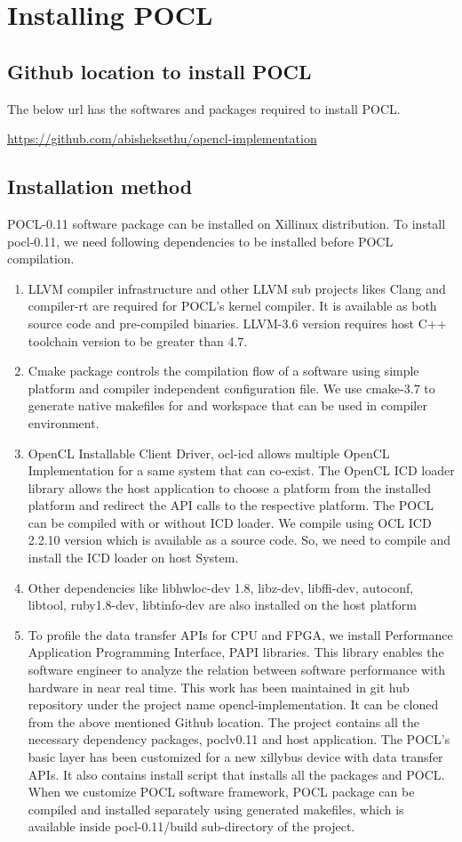 \section{Installing POCL}
\subsection{Github location to install POCL}
The below url has the softwares and packages required to install POCL.

\url{https://github.com/abisheksethu/opencl-implementation}

\subsection{Installation method}
POCL-0.11 software package can be installed on Xillinux distribution. To install pocl-0.11, we need following dependencies to be installed before POCL compilation. 
\begin{enumerate}
	\item LLVM compiler infrastructure and other LLVM sub projects likes Clang and compiler-rt are required for POCL’s kernel compiler. It is available as both source code and pre-compiled binaries. LLVM-3.6 version requires host C++ toolchain version to be greater than 4.7. 
	\item Cmake package controls the compilation flow of a software using simple platform and compiler independent configuration file. We use cmake-3.7 to generate native makefiles for and workspace that can be used in compiler environment. 
	\item OpenCL Installable Client Driver, ocl-icd allows multiple OpenCL Implementation for a same system that can co-exist. The OpenCL ICD loader library allows the host application to choose a platform from the installed platform and redirect the API calls to the respective platform. The POCL can be compiled with or without ICD loader. We compile using OCL ICD 2.2.10 version which is available as a source code. So, we need to compile and install the ICD loader on host System.
	\item Other dependencies like libhwloc-dev 1.8, libz-dev, libffi-dev, autoconf, libtool, ruby1.8-dev, libtinfo-dev are also installed on the host platform
	\item To profile the data transfer APIs for CPU and FPGA, we install Performance Application Programming Interface, PAPI libraries. This library 	enables the software engineer to analyze the relation between software performance with hardware in near real time. 
This work has been maintained in git hub repository under the project name opencl-implementation. It can be cloned from the above mentioned Github location. The project contains all the necessary dependency packages, poclv0.11 and host application. The POCL’s basic layer has been customized for a new xillybus device with data transfer APIs. It also contains install script that installs all the packages and POCL. When we customize POCL software framework, POCL package can be compiled and installed separately using generated makefiles, which is available inside pocl-0.11/build sub-directory of the project.
\end{enumerate}


